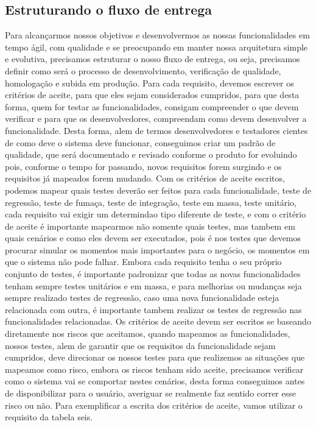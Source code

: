     \subsection{Estruturando o fluxo de entrega}
    Para alcançarmos nossos objetivos e desenvolvermos as nossas funcionalidades
    em tempo ágil, com qualidade e se preocupando em manter nossa arquitetura
    simple e evolutiva, precisamos estruturar o nosso fluxo de entrega, ou seja,
    precisamos definir como será o processo de desenvolvimento, verificação de
    qualidade, homologação e subida em produção. \newline
    Para cada requisito, devemos escrever os critérios de aceite, para que eles
    sejam considerados cumpridos, para que desta forma, quem for testar as
    funcionalidades, consigam compreender o que devem verificar e para que os
    desenvolvedores, compreendam como devem desenvolver a funcionalidade. Desta
    forma, alem de termos desenvolvedores e testadores cientes de como deve
    o sistema deve funcionar, conseguimos criar um padrão de qualidade, que será
    documentado e revisado conforme o produto for evoluindo pois, conforme o tempo
    for passando, novos requisitos forem surgindo e os requisitos já mapeados
    forem mudando. Com os critérios de aceite escritos, podemos mapear quais
    testes deverão ser feitos para cada funcionalidade, teste de regressão, teste
    de fumaça, teste de integração, teste em massa, teste unitário, cada requisito
    vai exigir um determindao tipo diferente de teste, e com o critério de aceite
    é importante mapearmos não somente quais testes, mas tambem em quais cenários
    e como eles devem ser executados, pois é nos testes que devemos procurar simular
    os momentos mais importantes para o negócio, os momentos em que o sistema não
    pode falhar. Embora cada requisito tenha o seu próprio conjunto de testes,
    é importante padronizar que todas as novas funcionalidades tenham sempre testes
    unitários e em massa, e para melhorias ou mudanças seja sempre realizado testes
    de regressão, caso uma nova funcionalidade esteja relacionada com outra, é
    importante tambem realizar os testes de regressão nas funcionalidades
    relacionadas. Os critérios de aceite devem ser escritos se baseando diretamente
    nos riscos que aceitamos, quando mapeamos as funcionalidades, nossos testes,
    alem de garantir que os requisitos da funcionalidade sejam cumpridos, deve
    direcionar os nossos testes para que realizemos as situações que mapeamos como
    risco, embora os riscos tenham sido aceite, precisamos verificar como o sistema
    vai se comportar nestes cenários, desta forma conseguimos antes de disponibilizar
    para o usuário, averiguar se realmente faz sentido correr esse risco ou não. \newline
    Para exemplificar a escrita dos critérios de aceite, vamos utilizar o requisito
    da tabela seis. \newline

